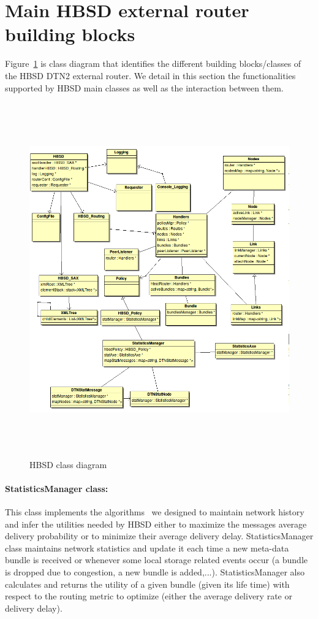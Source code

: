 \section{Main HBSD external router building blocks}

Figure~\ref{HBSD-CLASS} is class diagram that identifies the different building blocks/classes of the HBSD DTN2 external router. We detail in this section the functionalities supported by HBSD main classes as well as the interaction between them.

\begin{figure}[!h]
\centering
\includegraphics[width=6in, height=6in]{Chapitre4/HBSDClasses.png}
\caption{HBSD class diagram}
\label{HBSD-CLASS}
\end{figure}

\paragraph{StatisticsManager class:}

This class implements the algorithms~\cite{TMC:Report} we designed to maintain network history and infer the utilities needed by HBSD either to maximize the messages average delivery probability  or to minimize their average delivery delay.  
StatisticsManager class maintains network statistics and update it each time a new meta-data bundle is received or whenever some local storage related events occur (a bundle is dropped due to congestion, a new bundle is added,...).
StatisticsManager also calculates and returns the utility of a given bundle (given its life time) with respect to the routing metric to optimize (either the average delivery rate or delivery delay).

